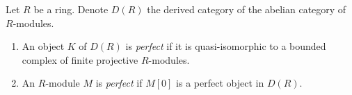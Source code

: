 \begin{definition}
\label{definition-perfect}
Let $R$ be a ring. Denote $D(R)$ the derived category of the abelian
category of $R$-modules.
\begin{enumerate}
\item An object $K$ of $D(R)$ is {\it perfect} if it is quasi-isomorphic
to a bounded complex of finite projective $R$-modules.
\item An $R$-module $M$ is {\it perfect} if $M[0]$ is a perfect object
in $D(R)$.
\end{enumerate}
\end{definition}